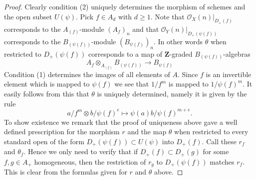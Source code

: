 \documentclass{stacks-project}
\theoremstyle{plain}
\theoremstyle{definition}
\theoremstyle{remark}
\numberwithin{equation}{subsection}
\begin{document}
\begin{proof}
Clearly condition (2) uniquely determines the morphism of schemes
and the open subset $U(\psi)$. Pick $f \in A_d$ with $d \geq 1$.
Note that
$\mathcal{O}_X(n)|_{D_{+}(f)}$ corresponds to the
$A_{(f)}$-module $(A_f)_n$ and that
$\mathcal{O}_Y(n)|_{D_{+}(\psi(f))}$ corresponds to the
$B_{(\psi(f))}$-module $(B_{\psi(f)})_n$. In other words $\theta$
when restricted to $D_{+}(\psi(f))$ corresponds to a map of
$\mathbf{Z}$-graded $B_{(\psi(f))}$-algebras
$$
A_f \otimes_{A_{(f)}} B_{(\psi(f))}
\longrightarrow
B_{\psi(f)}
$$
Condition (1) determines the images of all elements of $A$.
Since $f$ is an invertible element which is mapped to $\psi(f)$
we see that $1/f^m$ is mapped to $1/\psi(f)^m$. It easily follows
from this that $\theta$ is uniquely determined, namely it is
given by the rule
$$
a/f^m \otimes b/\psi(f)^e \longmapsto \psi(a)b/\psi(f)^{m + e}.
$$
To show existence we remark that the proof of uniqueness above gave
a well defined prescription for the morphism $r$ and the map $\theta$
when restricted to every standard open of the form
$D_{+}(\psi(f)) \subset U(\psi)$ into $D_{+}(f)$.
Call these $r_f$ and $\theta_f$.
Hence we only need to verify that if $D_{+}(f) \subset D_{+}(g)$
for some $f, g \in A_{+}$ homogeneous, then the restriction of
$r_g$ to $D_{+}(\psi(f))$ matches $r_f$. This is clear from the
formulas given for $r$ and $\theta$ above.
\end{proof}
\end{document}

